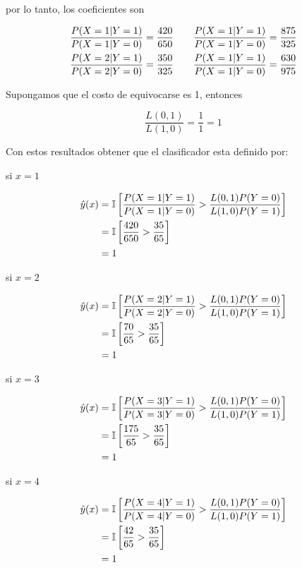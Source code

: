 por lo tanto, los coeficientes son

\begin{align*}
    \frac{P(X=1|Y=1)}{P(X=1|Y=0)} = \frac{420}{650} & \qquad \frac{P(X=1|Y=1)}{P(X=1|Y=0)} = \frac{875}{325} \\
    \frac{P(X=2|Y=1)}{P(X=2|Y=0)} = \frac{350}{325} & \qquad \frac{P(X=1|Y=1)}{P(X=1|Y=0)} = \frac{630}{975}
\end{align*}

Supongamos que el costo de equivocarse es 1, entonces

\begin{equation*}
    \frac{L(0,1)}{L(1,0)} = \frac{1}{1} = 1
\end{equation*}

Con estos resultados obtener que el clasificador esta definido por:

si $x=1$

\begin{align*}
    \hat{y}(x) & = \mathbb{I} \left [\frac{P(X=1|Y=1)}{P(X=1|Y=0)} > \frac{L(0,1)P(Y=0)}{L(1,0)P(Y=1)}\right ] \\
               & = \mathbb{I} \left [\frac{420}{650}  > \frac{35}{65}\right ]                                  \\
               & = 1
\end{align*}

si $x=2$

\begin{align*}
    \hat{y}(x) & = \mathbb{I} \left [\frac{P(X=2|Y=1)}{P(X=2|Y=0)} > \frac{L(0,1)P(Y=0)}{L(1,0)P(Y=1)}\right ] \\
               & = \mathbb{I} \left [\frac{70}{65}  > \frac{35}{65}\right ]                                    \\
               & = 1
\end{align*}

si $x=3$

\begin{align*}
    \hat{y}(x) & = \mathbb{I} \left [\frac{P(X=3|Y=1)}{P(X=3|Y=0)} > \frac{L(0,1)P(Y=0)}{L(1,0)P(Y=1)}\right ] \\
               & = \mathbb{I} \left [\frac{175}{65}  > \frac{35}{65}\right ]                                   \\
               & = 1
\end{align*}

si $x=4$

\begin{align*}
    \hat{y}(x) & = \mathbb{I} \left [\frac{P(X=4|Y=1)}{P(X=4|Y=0)} > \frac{L(0,1)P(Y=0)}{L(1,0)P(Y=1)}\right ] \\
               & = \mathbb{I} \left [\frac{42}{65}  > \frac{35}{65}\right ]                                    \\
               & = 1
\end{align*}


